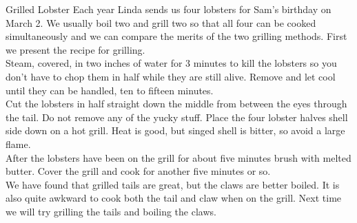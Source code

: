 \begin{recipe}{Grilled Lobster}{}{}
\freeform Each year Linda sends us four lobsters for Sam's birthday on
March 2.  We usually boil two and grill two so that all four can be
cooked simultaneously and we can compare the merits of the two
grilling methods.  First we present the recipe for grilling.\\
Steam, covered, in two inches of water for 3 minutes to kill
the lobsters so you don't have to chop them in half while they are
still alive.  Remove and let cool until they can be handled, ten to
fifteen minutes.\\
\freeform Cut the lobsters in half straight down the middle from
between the eyes through the tail.  Do not remove any of the yucky
stuff.  Place the four lobster halves shell side down on a hot grill.  Heat is
good, but singed shell is bitter, so avoid a large flame.\\
After the lobsters have been on the grill for about five minutes brush
with melted butter.  Cover the grill and cook for another five minutes
or so.\\
\freeform We have found that grilled tails are great, but the claws
are better boiled.  It is also quite awkward to cook both the tail and
claw when on the grill.  Next time we will try grilling the tails
and boiling the claws.
\end{recipe}

